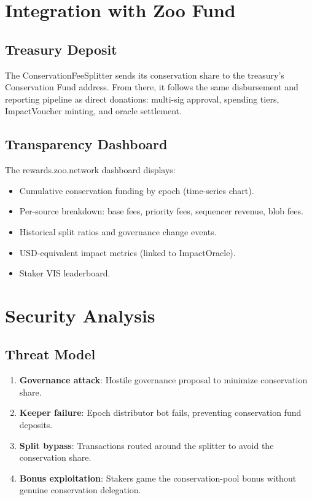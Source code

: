 \documentclass[11pt,letterpaper]{article}
\begin{document}
\section{Integration with Zoo Fund}

\subsection{Treasury Deposit}

The ConservationFeeSplitter sends its conservation share to the treasury's Conservation Fund address. From there, it follows the same disbursement and reporting pipeline as direct donations: multi-sig approval, spending tiers, ImpactVoucher minting, and oracle settlement.

\subsection{Transparency Dashboard}

The rewards.zoo.network dashboard displays:
\begin{itemize}
    \item Cumulative conservation funding by epoch (time-series chart).
    \item Per-source breakdown: base fees, priority fees, sequencer revenue, blob fees.
    \item Historical split ratios and governance change events.
    \item USD-equivalent impact metrics (linked to ImpactOracle).
    \item Staker VIS leaderboard.
\end{itemize}

\section{Security Analysis}

\subsection{Threat Model}

\begin{enumerate}
    \item \textbf{Governance attack}: Hostile governance proposal to minimize conservation share.
    \item \textbf{Keeper failure}: Epoch distributor bot fails, preventing conservation fund deposits.
    \item \textbf{Split bypass}: Transactions routed around the splitter to avoid the conservation share.
    \item \textbf{Bonus exploitation}: Stakers game the conservation-pool bonus without genuine conservation delegation.
\end{enumerate}
\end{document}
